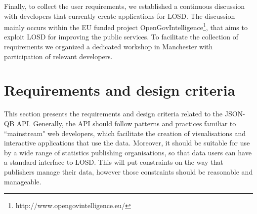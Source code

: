 \documentclass{llncs}
\begin{document}
Finally, to collect the user requirements, we established a continuous discussion with developers that currently create applications for LOSD. The discussion mainly occurs within the EU funded project OpenGovIntelligence\footnote{http://www.opengovintelligence.eu/}, that aims to exploit LOSD for improving the public services. To facilitate the collection of requirements we organized a dedicated workshop in Manchester with participation of relevant developers. 


\section{Requirements and design criteria}\label{sec:reqs}

This section presents the requirements and design criteria related to the JSON-QB API. Generally, the API should follow patterns and practices familiar to ``mainstream" web developers, which facilitate the creation of visualisations and interactive applications that use the data. Moreover, it should be suitable for use by a wide range of statistics publishing organisations, so that data users can have a standard interface to LOSD. This will put constraints on the way that publishers manage their data, however those constraints should be reasonable and manageable. 
%
\end{document}
